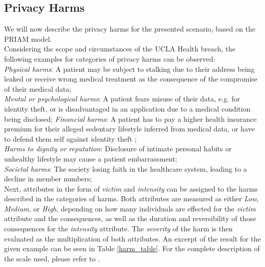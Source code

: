 \subsection{Privacy Harms}
We will now describe the privacy harms for the presented scenario, based on the PRIAM model\cite[Section 3.7]{de:hal-01302541}.\\
Considering the scope and circumstances of the UCLA Health breach, the following examples for categories of privacy harms can be observed:\\
\textit{Physical harms}: A patient may be subject to stalking due to their address being leaked or receive wrong medical treatment as the consequence of the compromise of their medical data;\\
\textit{Mental or psychological harms}: A patient fears misuse of their data, e.g. for identity theft, or is disadvantaged in an application due to a medical condition being disclosed;
\textit{Financial harms}: A patient has to pay a higher health insurance premium for their alleged sedentary lifestyle inferred from medical data, or have to defend them self against identity theft ;\\
\textit{Harms to dignity or reputation}: Disclosure of intimate personal habits or unhealthy lifestyle may cause a patient embarrassment;\\
\textit{Societal harms}: The society losing faith in the healthcare system, leading to a decline in member numbers;\\
Next, attributes in the form of \textit{victim} and \textit{intensity} can be assigned to the harms described in the categories of harms. Both attributes are measured as either \textit{Low}, \textit{Medium}, or \textit{High}, depending on how many individuals are effected for the \textit{victim} attribute and the consequences, as well as the duration and reversibility of those consequences for the \textit{intensity} attribute. The \textit{severity} of the harm is then evaluated as the multiplication of both attributes. An excerpt of the result for the given example can be seen in Table \ref{harm_table}. For the complete description of the scale used, please refer to \cite[Section 3.7.1]{de:hal-01302541}.\\
